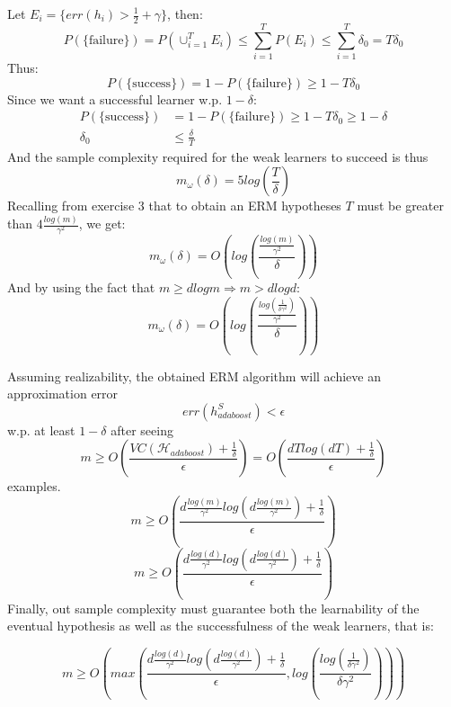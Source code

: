 Let $E_i = \{err(h_i) > \frac{1}{2} + \gamma\}$, then:
\begin{equation*}
    P(\{\text{failure}\}) = P(\cup_{i=1}^T E_i) \leq \sum_{i=1}^T P(E_i) \leq \sum_{i=1}^T \delta_0 = T\delta_0
\end{equation*}
Thus:
\begin{equation*}
    P(\{\text{success}\}) = 1 - P(\{\text{failure}\}) \geq 1 - T\delta_0
\end{equation*}
Since we want a successful learner w.p. $1-\delta$:
\begin{equation*}
    \begin{split}        
        P(\{\text{success}\}) &= 1 - P(\{\text{failure}\}) \geq 1 - T\delta_0 \geq 1-\delta \\
        \delta_0 &\leq \frac{\delta}{T}
    \end{split}
\end{equation*}
And the sample complexity required for the weak learners to succeed is thus
\begin{equation*}
    m_\omega (\delta) = 5log(\frac{T}{\delta})
\end{equation*}
Recalling from exercise 3 that to obtain an ERM hypotheses $T$ must be greater than $4\frac{log(m)}{\gamma^2}$, we get:
\begin{equation*}
    m_\omega (\delta) = O(log(\frac{\frac{log(m)}{\gamma^2}}{\delta}))
\end{equation*}
And by using the fact that $m \geq dlogm \Rightarrow m > d log d$:
\begin{equation*}
    m_\omega (\delta) = O(log(\frac{\frac{log(\frac{1}{\delta \gamma^2})}{\gamma^2}}{\delta}))
\end{equation*}

Assuming realizability, the obtained ERM algorithm will achieve an approximation error
\begin{equation*}
    err(h^S_\mathit{adaboost}) < \epsilon
\end{equation*}
w.p. at least $1-\delta$ after seeing
\begin{equation*}    
    m\geq O(\frac{VC(\mathcal{H}_\mathit{adaboost}) + \frac{1}{\delta}}{\epsilon}) = O(\frac{dT log(dT) + \frac{1}{\delta}}{\epsilon})
\end{equation*}
examples. 
\begin{equation*}
    m\geq O(\frac{d\frac{log(m)}{\gamma^2} log(d\frac{log(m)}{\gamma^2}) + \frac{1}{\delta}}{\epsilon})
\end{equation*}
\begin{equation*}
    m\geq O(\frac{d\frac{log(d)}{\gamma^2} log(d\frac{log(d)}{\gamma^2}) + \frac{1}{\delta}}{\epsilon})
\end{equation*}
Finally, out sample complexity must guarantee both the learnability of the eventual hypothesis as well as the successfulness of the weak learners, that is:

\begin{equation*}
    m\geq O\left(max(\frac{d\frac{log(d)}{\gamma^2} log(d\frac{log(d)}{\gamma^2}) + \frac{1}{\delta}}{\epsilon}, log(\frac{log(\frac{1}{\delta \gamma^2})}{\delta \gamma^2}))\right)
\end{equation*}